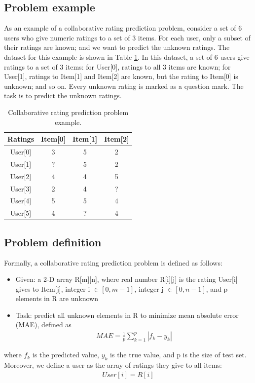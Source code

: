\documentclass[12pt]{WSUThesis}
\theoremstyle{definition}
\begin{document}
\subsection{Problem example}
As an example of a collaborative rating prediction problem, consider 
a set of 6 users who give numeric ratings to a set of 3 items.
For each user, only a subset of their ratings are known; 
and we want to predict the unknown ratings.
The dataset for this example is shown in Table \ref{tab:ratings}.
In this dataset, a set of 6 users give ratings to a set of 3 items: 
for User[0], ratings to all 3 items are known; 
for User[1], ratings to Item[1] and Item[2] are known, 
but the rating to Item[0] is unknown; and so on.
Every unknown rating is marked as a question mark.
The task is to predict the unknown ratings.
\begin{table}[!htb]
	\centering
	\caption{Collaborative rating prediction problem example.}
	\begin{tabular}{cccc} \hline
		Ratings & Item[0] & Item[1] & Item[2] \\ \hline
		User[0] & 3       & 5       & 2 \\ \hline
		User[1] & ?       & 5       & 2 \\ \hline
		User[2] & 4       & 4       & 5 \\ \hline
		User[3] & 2       & 4       & ? \\ \hline
		User[4] & 5       & 5       & 4 \\ \hline
		User[5] & 4       & ?       & 4 \\ \hline
	\end{tabular}
	\label{tab:ratings}
\end{table}

\subsection{Problem definition}
Formally, a collaborative rating prediction problem is defined as follows:
\begin{itemize}
	\item Given: a 2-D array R[m][n], 
	where real number R[i][j] is the rating User[i] gives to Item[j],
	integer i $ \in [0, m-1] $, integer j $ \in [0, n-1] $,
	and p elements in R are unknown
	\item Task: predict all unknown elements in R to minimize mean absolute error (MAE), defined as
	\begin{align*}
	MAE = \frac{1}{p} \sum_{k = 1}^{p}|f_k - y_k|
	\end{align*}
\end{itemize}
where $ f_k $ is the predicted value, $ y_k $ is the true value, and p is the 
size of test set.
Moreover, we define a user as the array of ratings they give to all items: 
\begin{align*}
User[i] = R[i]
\end{align*}
\end{document}
